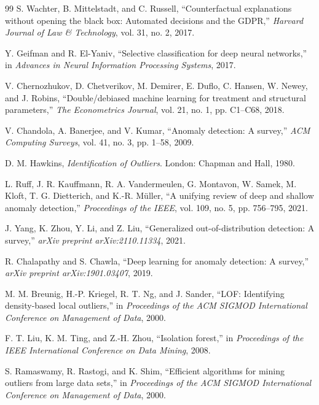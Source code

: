 \documentclass[10pt,conference]{IEEEtran}
\begin{document}
\begin{thebibliography}{99}
S. Wachter, B. Mittelstadt, and C. Russell, ``Counterfactual explanations
without opening the black box: Automated decisions and the GDPR,''
\emph{Harvard Journal of Law \& Technology}, vol. 31, no. 2, 2017.

Y. Geifman and R. El-Yaniv, ``Selective classification for deep neural
networks,'' in \emph{Advances in Neural Information Processing Systems}, 2017.

V. Chernozhukov, D. Chetverikov, M. Demirer, E. Duflo, C. Hansen, W. Newey,
and J. Robins, ``Double/debiased machine learning for treatment and
structural parameters,'' \emph{The Econometrics Journal}, vol. 21, no. 1,
pp. C1--C68, 2018.

V. Chandola, A. Banerjee, and V. Kumar, ``Anomaly detection: A survey,''
\emph{ACM Computing Surveys}, vol. 41, no. 3, pp. 1--58, 2009.

D. M. Hawkins, \emph{Identification of Outliers}. London: Chapman and Hall,
1980.

L. Ruff, J. R. Kauffmann, R. A. Vandermeulen, G. Montavon, W. Samek,
M. Kloft, T. G. Dietterich, and K.-R. M\"uller, ``A unifying review of deep
and shallow anomaly detection,'' \emph{Proceedings of the IEEE}, vol. 109,
no. 5, pp. 756--795, 2021.

J. Yang, K. Zhou, Y. Li, and Z. Liu, ``Generalized out-of-distribution
detection: A survey,'' \emph{arXiv preprint arXiv:2110.11334}, 2021.

R. Chalapathy and S. Chawla, ``Deep learning for anomaly detection: A
survey,'' \emph{arXiv preprint arXiv:1901.03407}, 2019.

M. M. Breunig, H.-P. Kriegel, R. T. Ng, and J. Sander, ``LOF: Identifying
density-based local outliers,'' in \emph{Proceedings of the ACM SIGMOD
International Conference on Management of Data}, 2000.

F. T. Liu, K. M. Ting, and Z.-H. Zhou, ``Isolation forest,'' in
\emph{Proceedings of the IEEE International Conference on Data Mining}, 2008.

S. Ramaswamy, R. Rastogi, and K. Shim, ``Efficient algorithms for mining
outliers from large data sets,'' in \emph{Proceedings of the ACM SIGMOD
International Conference on Management of Data}, 2000.


\end{thebibliography}
\end{document}
